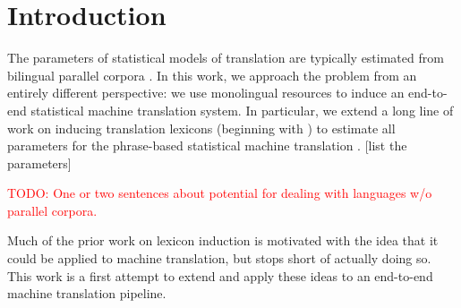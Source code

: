 \documentclass[11pt]{article}
\newcommand{\mnote}[1]{\marginpar{%
  \vskip-\baselineskip
  \raggedright\footnotesize
  \itshape\hrule\smallskip\tiny{#1}\par\smallskip\hrule}}
\newcommand{\mtodo}[1]{\mnote{\textcolor{red}{#1}}}
\newcommand{\todo}[1]{\textcolor{red}{TODO: #1}}
\begin{document}
\begin{abstract}
\end{abstract}


\section{Introduction} \label{sect:intro}


The parameters of statistical models of translation are typically estimated from bilingual parallel corpora \cite{Brown:1993}. 
In this work, we approach the problem from an entirely different perspective: we use monolingual resources to induce an end-to-end statistical machine translation system.  In particular, we extend a long line of work on inducing translation lexicons (beginning with ) to estimate all parameters for the phrase-based statistical machine translation \cite{Koehn:2003}.   [list the parameters]

\todo{One or two sentences about potential for dealing with languages w/o parallel corpora.}

Much of the prior work on lexicon induction is motivated with the idea that it could be applied to machine translation, but stops short of actually doing so.  This work is a first attempt to extend and apply these ideas to an end-to-end machine translation pipeline. 



\end{document}
